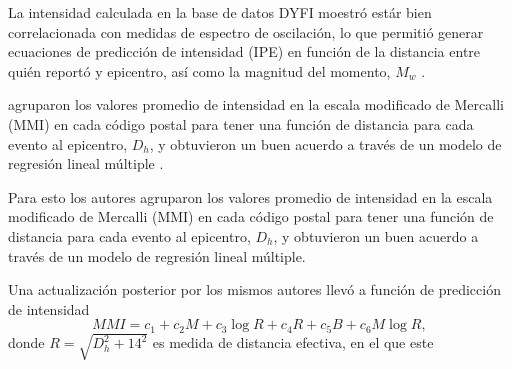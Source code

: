 \documentclass[a4paper]{report}
\begin{document}
La intensidad calculada en la base de datos DYFI moestró estár bien correlacionada con medidas de espectro de oscilación, lo que permitió generar ecuaciones de predicción de intensidad (IPE) en función de la distancia entre quién reportó y epicentro, así como la magnitud del momento, \(M_w\) \cite{atkinson_did_2007}.


agruparon los valores promedio de intensidad en la escala modificado de Mercalli (MMI) en cada código postal para tener una función de distancia para cada evento al epicentro, \(D_h\), y obtuvieron un buen acuerdo a través de un modelo de regresión lineal múltiple \cite{atkinson_did_2007}.


Para esto los autores agruparon los valores promedio de intensidad en la escala modificado de Mercalli (MMI) en cada código postal para tener una función de distancia para cada evento al epicentro, \(D_h\), y obtuvieron un buen acuerdo a través de un modelo de regresión lineal múltiple.

Una actualización posterior por los mismos autores llevó a  función de predicción de intensidad  
\begin{equation}
	MMI = c_1 + c_2 M + c_3 \log{R} + c_4 R + c_5 B + c_6 M \log{R},
	\label{eq:atkinson2014}
\end{equation}
donde \(R = \sqrt{D_h^2 + 14^2 }\) es medida de distancia efectiva, en el que este 








\end{document}
